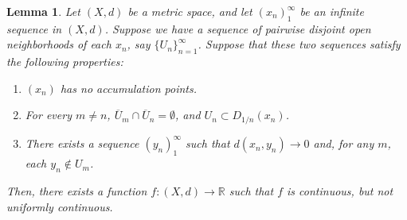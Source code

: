 \documentclass[openany, amssymb, psamsfonts]{amsart}
\newtheorem{lem}{Lemma}[section]
\theoremstyle{definition}
\numberwithin{equation}{section}
\begin{document}
\begin{lem} \label{lem:5.1}
  Let $(X,d)$ be a metric space, and let $(x_n)_1^\infty$ be an infinite sequence in $(X,d)$. Suppose we have a sequence of pairwise disjoint open neighborhoods of each $x_n$, say $\{U_n\}_{n=1}^\infty$. Suppose that these two sequences satisfy the following properties:
  \begin{enumerate}
    \item $(x_n)$ has no accumulation points. \label{5.1.1}
    \item For every $m\neq n$, $\overline{U}_m \cap \overline{U}_n = \emptyset$, and $U_n \subset D_{1/n}(x_n)$. \label{5.1.2}
    \item There exists a sequence $(y_n)_1^\infty$ such that $d(x_n,y_n) \to 0$ and, for any $m$, each $y_n \not \in U_m$. \label{5.1.3}
  \end{enumerate}
  Then, there exists a function $f:(X,d) \to \mathbb R$ such that $f$ is continuous, but not uniformly continuous. 
\end{lem}
\end{document}

